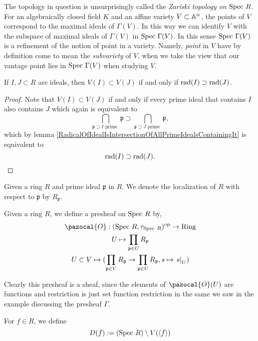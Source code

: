 \begin{remark}
    The topology in question is unsurprisingly called the \emph{Zariski topology on $\mathrm{Spec} \ R$}. For an algebraically closed field $K$ and an affine variety $V\subset \mathbb{A}^n$, the points of $V$ correspond to the maximal ideals of $\Gamma(V)$. In this way we can identify $V$ with the subspace of maximal ideals of $\Gamma(V)$ in $\mathrm{Spec} \ \Gamma(V)$. In this sense $\mathrm{Spec} \ \Gamma(V)$ is a refinement of the notion of point in a variety. Namely, \emph{point} in $V$ have by definition come to mean the \emph{subvariety} of $V$, when we take the view that our vantage point lies in $\mathrm{Spec}\ \Gamma(V)$ when studying $V$.
\end{remark}
\begin{lemma}
    If $I,J\subset R$ are ideals, then $V(I)\subset V(J)$ if and only if $\mathrm{rad}(I)\supset \mathrm{rad}(J)$.
\end{lemma}
\begin{proof}
    Note that $V(I)\subset V(J)$ if and only if every prime ideal that contains $I$ also contains $J$ which again is equivalent to 
    $$
        \bigcap_{\mathfrak{p}\supset I \text{ prime }} \mathfrak{p} \supset \bigcap_{\mathfrak{p}\supset J \text{ prime }} \mathfrak{p}, 
    $$
    which by lemma \ref{RadicalOfIdealIsIntersectionOfAllPrimeIdealsContainingIt} is equivalent to 
    $$
        \mathrm{rad}(I)\supset \mathrm{rad}(J).
    $$
\end{proof}
Given a ring $R$ and prime ideal $\mathfrak{p}$ in $R$. We denote the localization of $R$ with respect to $\mathfrak{p}$ by $R_\mathfrak{p}$.
\begin{definition}
    Given a ring $R$, we define a presheaf on $\mathrm{Spec} \ R$ by, 
    \begin{gather*}
        \pazocal{O}:(\Spec\ R, \tau_{\Spec\ R})\op\rightarrow \mathrm{Ring}\\
        U \mapsto \prod_{\mathfrak{p}\in U} R_\mathfrak{p}\\
        U\subset V \mapsto (\prod_{\mathfrak{p}\in V} R_\mathfrak{p}\rightarrow \prod_{\mathfrak{p}\in U} R_\mathfrak{p}, s\mapsto \left. s\right|_U) 
    \end{gather*}
\end{definition}
\begin{remark}
    Clearly this presheaf is a sheaf, since the elements of $\pazocal{O}(U)$ are functions and restriction is just set function restriction in the same we saw in the example discussing the presheaf $\Gamma$. 
\end{remark}
\begin{definition}
    For $f\in R$, we define 
    $$
        D(f) := (\mathrm{Spec} \ R)\setminus V(\langle f\rangle)
    $$
\end{definition}
